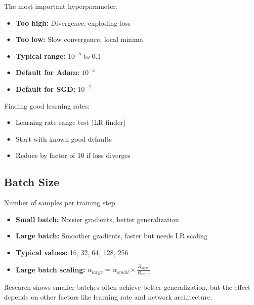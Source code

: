 The most important hyperparameter.

\begin{itemize}
    \item \textbf{Too high:} Divergence, exploding loss
    \item \textbf{Too low:} Slow convergence, local minima
    \item \textbf{Typical range:} $10^{-5}$ to $0.1$
    \item \textbf{Default for Adam:} $10^{-3}$
    \item \textbf{Default for SGD:} $10^{-2}$
\end{itemize}

Finding good learning rates:
\begin{itemize}
    \item Learning rate range test (LR finder)
    \item Start with known good defaults
    \item Reduce by factor of 10 if loss diverges
\end{itemize}

\subsection{Batch Size}

Number of samples per training step.

\begin{itemize}
    \item \textbf{Small batch:} Noisier gradients, better generalization
    \item \textbf{Large batch:} Smoother gradients, faster but needs LR scaling
    \item \textbf{Typical values:} 16, 32, 64, 128, 256
    \item \textbf{Large batch scaling:} $\alpha_{large} = \alpha_{small} \times \frac{B_{large}}{B_{small}}$
\end{itemize}

\begin{note}
Research shows smaller batches often achieve better generalization, but the effect depends on other factors like learning rate and network architecture.
\end{note}

